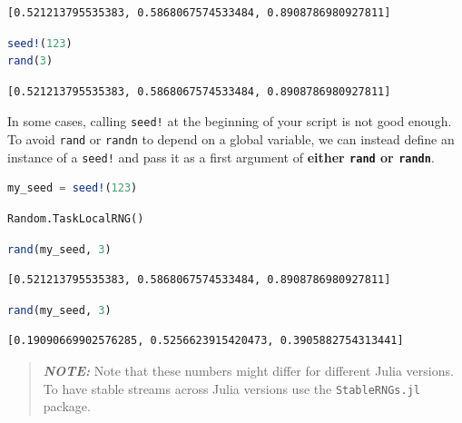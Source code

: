\documentclass[
  notoc %
]{tufte-book}
\newcommand{\passthrough}[1]{#1}
\begin{document}
\begin{lstlisting}[language=Output]
[0.521213795535383, 0.5868067574533484, 0.8908786980927811]
\end{lstlisting}

\begin{lstlisting}[language=Julia]
seed!(123)
rand(3)
\end{lstlisting}

\begin{lstlisting}[language=Output]
[0.521213795535383, 0.5868067574533484, 0.8908786980927811]
\end{lstlisting}

In some cases, calling \passthrough{\lstinline"seed!"} at the beginning
of your script is not good enough. To avoid
\passthrough{\lstinline!rand!} or \passthrough{\lstinline!randn!} to
depend on a global variable, we can instead define an instance of a
\passthrough{\lstinline"seed!"} and pass it as a first argument of
\textbf{either \passthrough{\lstinline!rand!} or
\passthrough{\lstinline!randn!}}.

\begin{lstlisting}[language=Julia]
my_seed = seed!(123)
\end{lstlisting}

\begin{lstlisting}[language=Output]
Random.TaskLocalRNG()
\end{lstlisting}

\begin{lstlisting}[language=Julia]
rand(my_seed, 3)
\end{lstlisting}

\begin{lstlisting}[language=Output]
[0.521213795535383, 0.5868067574533484, 0.8908786980927811]
\end{lstlisting}

\begin{lstlisting}[language=Julia]
rand(my_seed, 3)
\end{lstlisting}

\begin{lstlisting}[language=Output]
[0.19090669902576285, 0.5256623915420473, 0.3905882754313441]
\end{lstlisting}

\begin{quote}
\textbf{\emph{NOTE:}} Note that these numbers might differ for different
Julia versions. To have stable streams across Julia versions use the
\passthrough{\lstinline!StableRNGs.jl!} package.
\end{quote}
\end{document}

